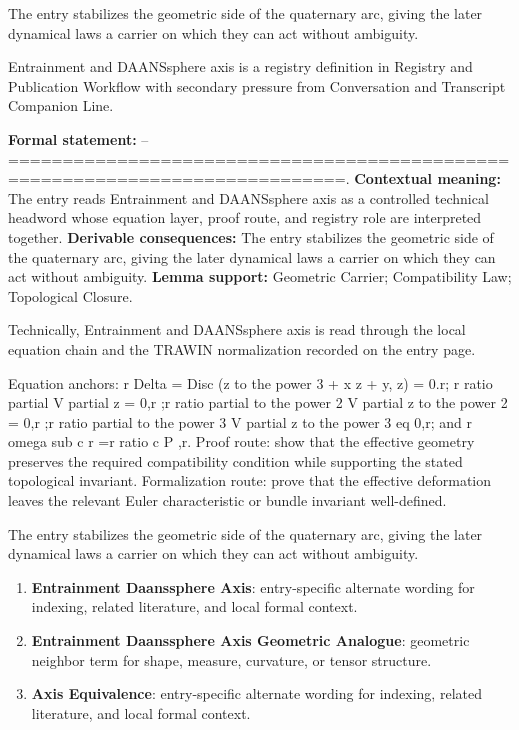The entry stabilizes the geometric side of the quaternary arc, giving the later dynamical laws a carrier on which they can act without ambiguity.
\clearpage


\begingroup\small
{}
Entrainment and DAANSsphere axis is a registry definition in Registry and Publication Workflow with secondary pressure from Conversation and Transcript Companion Line.

\begingroup\footnotesize\setlength{\emergencystretch}{3em}\sloppy
\textbf{Formal statement:} -- =============================================================================. \textbf{Contextual meaning:} The entry reads Entrainment and DAANSsphere axis as a controlled technical headword whose equation layer, proof route, and registry role are interpreted together. \textbf{Derivable consequences:} The entry stabilizes the geometric side of the quaternary arc, giving the later dynamical laws a carrier on which they can act without ambiguity. \textbf{Lemma support:} Geometric Carrier; Compatibility Law; Topological Closure.\par
\endgroup

Technically, Entrainment and DAANSsphere axis is read through the local equation chain and the TRAWIN normalization recorded on the entry page.

Equation anchors: r Delta = Disc (z to the power 3 + x z + y, z) = 0.r; r ratio partial V partial z = 0,r ;r ratio partial to the power 2 V partial z to the power 2 = 0,r ;r ratio partial to the power 3 V partial z to the power 3 eq 0,r; and r omega sub c r =r ratio c P ,r. Proof route: show that the effective geometry preserves the required compatibility condition while supporting the stated topological invariant. Formalization route: prove that the effective deformation leaves the relevant Euler characteristic or bundle invariant well-defined.

The entry stabilizes the geometric side of the quaternary arc, giving the later dynamical laws a carrier on which they can act without ambiguity.
\endgroup

\begin{enumerate}[leftmargin=1.6em,itemsep=6pt,topsep=4pt]
\item \textbf{Entrainment Daanssphere Axis}: entry-specific alternate wording for indexing, related literature, and local formal context.
\item \textbf{Entrainment Daanssphere Axis Geometric Analogue}: geometric neighbor term for shape, measure, curvature, or tensor structure.
\item \textbf{Axis Equivalence}: entry-specific alternate wording for indexing, related literature, and local formal context.
\end{enumerate}

